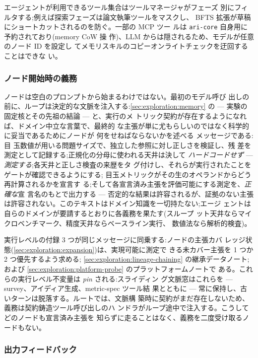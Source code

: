 エージェントが利用できるツール集合はツールマネージャがフェーズ
別にフィルタする;例えば探索フェーズは論文執筆ツールをマスクし、
BFTS 拡張が草稿にショートカットされるのを防ぐ。一部の MCP ツー
ルは \texttt{ari-core} 自身用に予約されており(memory CoW 操
作)、LLM からは隠されるため、モデルが任意のノード ID を設定し
てメモリスキルのコピーオンライトチェックを迂回することはできな
い。

\subsubsection*{ノード開始時の義務}

ノードは空白のプロンプトから始まるわけではない。最初のモデル呼び
出しの前に、ループは決定的な文脈を注入する:\cref{sec:exploration:memory}
の  — 実験の固定核とその先祖の結論 — と、実行のメ
トリック契約が存在するようになれば、ドメイン中立な言葉で、最終的
な主張が単に尤もらしいのではなく科学的に妥当であるためにノードが
何をせねばならないかを述べる メッセージである:目
玉数値が用いる問題サイズで、独立した参照に対し正しさを検証し、残
差を測定として記録する;正規化の分母に使われる天井は決して\emph{
ハードコードせず} — \emph{測定する};各天井と正しさ検査の来歴をタ
グ付けし、それらが実行されたことをゲートが確認できるようにする;
目玉メトリックがその生のオペランドからどう再計算されるかを宣言す
る;そして各宣言済み主張を評価可能にする測定を、\emph{正確な}宣
言名のもとで出力する — 否定的な結果は許容されるが、証拠のない主張
は許容されない。このテキストはドメイン知識を一切持たない;エージ
ェントは自らのドメインが要請するとおりに各義務を果たす(スループ
ット天井ならマイクロベンチマーク、精度天井ならベースライン実行、
数値法なら解析的検査)。

実行レベルの付録 3 つが同じメッセージに同乗する:ノードの主張カバ
レッジ状態(\cref{sec:exploration:expansion})は、実現可能に測定で
きる未カバー主張を 1 つか 2 つ優先するよう求める;
\cref{sec:exploration:lineage-chaining} の継承データノート;および
\cref{sec:exploration:platform-probe} のプラットフォームノートで
ある。これらの実行レベル不変量は \emph{pin} される:スライディン
グ文脈窓はこれらを — survey、アイディア生成、metric-spec ツール結
果とともに — 常に保持し、古いターンは脱落する。ルートでは、文脈構
築時に契約がまだ存在しないため、義務は契約鋳造ツール呼び出しのハ
ンドラがループ途中で注入する。こうしてどのノードも宣言済み主張を
知らずに走ることはなく、義務を二度受け取るノードもない。

\subsubsection*{出力フィードバック}

